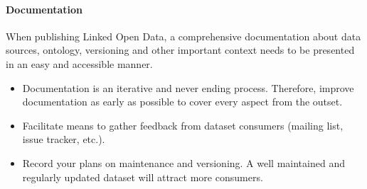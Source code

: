 \documentclass[a4paper,english,twoside,BCOR1.5cm,headsepline,DIV12,appendixprefix,final,12pt]{scrbook}
\begin{document}
\paragraph{Documentation}
When publishing Linked Open Data, a comprehensive documentation about data sources, ontology, versioning and other important context needs to be presented in an easy and accessible manner. 
\begin{itemize}
\itemsep0em 
\item Documentation is an iterative and never ending process. Therefore, improve documentation as early as possible to cover every aspect from the outset.
\item Facilitate means to gather feedback from dataset consumers (mailing list, issue tracker, etc.).%
\item Record your plans on maintenance and versioning. A well maintained and regularly updated dataset will attract more consumers.%
\end{itemize}

\vspace{-1.5em}
\end{document}
